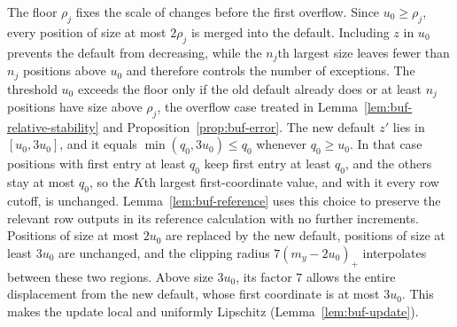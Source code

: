 The floor $\rho_j$ fixes the scale of changes before the first overflow.
Since $u_0\ge\rho_j$, every position of size at most $2\rho_j$ is merged
into the default. Including $z$ in $u_0$ prevents the default from
decreasing, while the $n_j$th largest size leaves fewer than $n_j$ positions
above $u_0$ and therefore controls the number of exceptions. The threshold
$u_0$ exceeds the floor only if the old default already does or at least
$n_j$ positions have size above $\rho_j$, the overflow case treated in
Lemma~\ref{lem:buf-relative-stability} and
Proposition~\ref{prop:buf-error}. The new default $z'$ lies in
$[u_0,3u_0]$, and it equals $\min(q_0,3u_0)\le q_0$ whenever $q_0\ge u_0$.
In that case positions with first entry at least $q_0$ keep first entry
at least $q_0$, and the others stay at most $q_0$, so the $K$th largest first-coordinate value, and with it every row cutoff, is unchanged.
Lemma~\ref{lem:buf-reference} uses this choice to preserve the relevant
row outputs in its reference calculation with no further increments. Positions of size
at most $2u_0$ are replaced by the new default, positions of size at least
$3u_0$ are unchanged, and the clipping radius $7(m_y-2u_0)_+$ interpolates
between these two regions. Above size $3u_0$, its factor $7$ allows the
entire displacement from the new default, whose first coordinate is at
most $3u_0$. This makes the update local and uniformly Lipschitz
(Lemma~\ref{lem:buf-update}).

